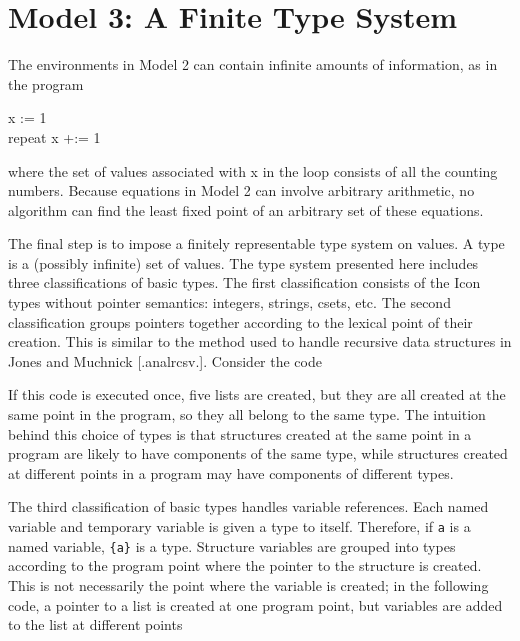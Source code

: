 \section*{Model 3: A Finite Type System}

The environments in Model 2 can contain infinite amounts of
information, as in the program

\goodbreak
\begin{iconcode}
\>x := 1\\
\>repeat x +:= 1\\
\end{iconcode}

\noindent where the set of values associated with x in the loop
consists of all the counting numbers. Because equations in Model 2 can
involve arbitrary arithmetic, no algorithm can find the least fixed
point of an arbitrary set of these equations.

The final step is to impose a finitely representable type system on
values. A type is a (possibly infinite) set of values. The type system
presented here includes three classifications of basic types. The
first classification consists of the Icon types without pointer
semantics: integers, strings, csets, etc. The second classification
groups pointers together according to the lexical point of their
creation. This is similar to the method used to handle recursive data
structures in Jones and Muchnick [.analrcsv.]. Consider the code



If this code is executed once, five lists are created, but they are
all created at the same point in the program, so they all belong to
the same type. The intuition behind this choice of types is that
structures created at the same point in a program are likely to have
components of the same type, while structures created at different
points in a program may have components of different types.

The third classification of basic types handles variable
references. Each named variable and temporary variable is given a type
to itself. Therefore, if \texttt{a} is a named variable,
\texttt{\{a\}} is a type. Structure variables are grouped into types
according to the program point where the pointer to the structure is
created. This is not necessarily the point where the variable is
created; in the following code, a pointer to a list is created at one
program point, but variables are added to the list at different points

